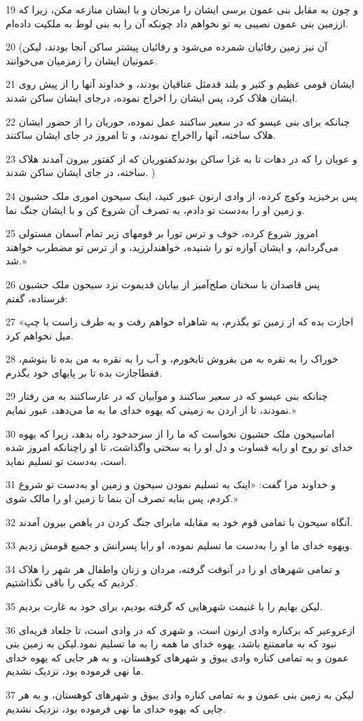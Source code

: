 \par 19 و چون به مقابل بنی عمون برسی ایشان را مرنجان و با ایشان منازعه مکن، زیرا که اززمین بنی عمون نصیبی به تو نخواهم داد چونکه آن را به بنی لوط به ملکیت داده‌ام.
\par 20 (آن نیز زمین رفائیان شمرده می‌شود و رفائیان پیشتر ساکن آنجا بودند، لیکن عمونیان ایشان را زمزمیان می‌خوانند.
\par 21 ایشان قومی عظیم و کثیر و بلند قدمثل عناقیان بودند، و خداوند آنها را از پیش روی ایشان هلاک کرد، پس ایشان را اخراج نموده، درجای ایشان ساکن شدند.
\par 22 چنانکه برای بنی عیسو که در سعیر ساکنند عمل نموده، حوریان را از حضور ایشان هلاک ساخته، آنها رااخراج نمودند، و تا امروز در جای ایشان ساکنند.
\par 23 و عویان را که در دهات تا به غزا ساکن بودندکفتوریان که از کفتور بیرون آمدند هلاک ساخته، در جای ایشان ساکن شدند. )
\par 24 پس برخیزید وکوچ کرده، از وادی ارنون عبور کنید، اینک سیحون اموری ملک حشبون و زمین او را به‌دست تو دادم، به تصرف آن شروع کن و با ایشان جنگ نما.
\par 25 امروز شروع کرده، خوف و ترس تورا بر قومهای زیر تمام آسمان مستولی می‌گردانم، و ایشان آوازه تو را شنیده، خواهندلرزید، و از ترس تو مضطرب خواهند شد.»
\par 26 پس قاصدان با سخنان صلح‌آمیز از بیابان قدیموت نزد سیحون ملک حشبون فرستاده، گفتم:
\par 27 «اجازت بده که از زمین تو بگذرم، به شاهراه خواهم رفت و به طرف راست یا چپ میل نخواهم کرد.
\par 28 خوراک را به نقره به من بفروش تابخورم، و آب را به نقره به من بده تا بنوشم، فقطاجازت بده تا بر پایهای خود بگذرم.
\par 29 چنانکه بنی عیسو که در سعیر ساکنند و موآبیان که در عارساکنند به من رفتار نمودند، تا از اردن به زمینی که یهوه خدای ما به ما می‌دهد، عبور نمایم.»
\par 30 اماسیحون ملک حشبون نخواست که ما را از سرحدخود راه بدهد، زیرا که یهوه خدای تو روح او رابه قساوت و دل او را به سختی واگذاشت، تا او راچنانکه امروز شده است، به‌دست تو تسلیم نماید.
\par 31 و خداوند مرا گفت: «اینک به تسلیم نمودن سیحون و زمین او به‌دست تو شروع کردم، پس بنابه تصرف آن بنما تا زمین او را مالک شوی.»
\par 32 آنگاه سیحون با تمامی قوم خود به مقابله مابرای جنگ کردن در یاهص بیرون آمدند.
\par 33 ویهوه خدای ما او را به‌دست ما تسلیم نموده، او رابا پسرانش و جمیع قومش زدیم.
\par 34 و تمامی شهرهای او را در آنوقت گرفته، مردان و زنان واطفال هر شهر را هلاک کردیم که یکی را باقی نگذاشتیم.
\par 35 لیکن بهایم را با غنیمت شهرهایی که گرفته بودیم، برای خود به غارت بردیم.
\par 36 ازعروعیر که برکناره وادی ارنون است، و شهری که در وادی است، تا جلعاد قریه‌ای نبود که به ماممتنع باشد، یهوه خدای ما همه را به ما تسلیم نمود.لیکن به زمین بنی عمون و به تمامی کناره وادی یبوق و شهرهای کوهستان، و به هر جایی که یهوه خدای ما نهی فرموده بود، نزدیک نشدیم.
\par 37 لیکن به زمین بنی عمون و به تمامی کناره وادی یبوق و شهرهای کوهستان، و به هر جایی که یهوه خدای ما نهی فرموده بود، نزدیک نشدیم. 
 
